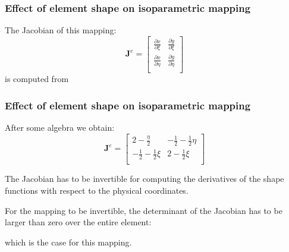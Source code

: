 \documentclass[notes]{beamer}
\begin{document}
\begin{frame}
\frametitle{Effect of element shape on isoparametric mapping}
The Jacobian of this mapping:
\begin{equation*}
	\mathbf{J}^e%
	=%
	\begin{bmatrix}
		\frac{\partial x}{\partial \xi} & \frac{\partial y}{\partial \xi} \\
		\frac{\partial x}{\partial \eta} & \frac{\partial y}{\partial \eta} \\
	\end{bmatrix}
\end{equation*}
is computed from
\end{frame}


\begin{frame}
\frametitle{Effect of element shape on isoparametric mapping}
After some algebra we obtain:
\begin{equation*}
\mathbf{J}^e%
=%
\begin{bmatrix}
2 - \frac{\eta}{2} & -\frac{1}{2} -\frac{1}{2}\eta \\
 -\frac{1}{2} -\frac{1}{2}\xi & 2 - \frac{1}{2}\xi \\
\end{bmatrix}
\end{equation*}

The Jacobian has to be invertible for computing the derivatives of the shape functions with
respect to the physical coordinates.

For the mapping to be invertible, the determinant of the Jacobian has to be larger than zero over the entire element:

which is the case for this mapping.
\end{frame}
\end{document}
